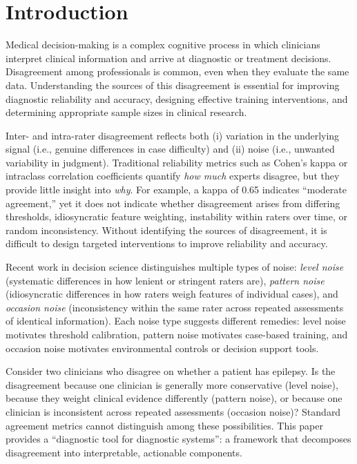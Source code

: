 \section*{Introduction}
\label{707961}

Medical decision-making is a complex cognitive process in which clinicians interpret clinical information and arrive at diagnostic or treatment decisions. Disagreement among professionals is common, even when they evaluate the same data. Understanding the sources of this disagreement is essential for improving diagnostic reliability and accuracy, designing effective training interventions, and determining appropriate sample sizes in clinical research.

Inter- and intra-rater disagreement reflects both (i) variation in the underlying signal (i.e., genuine differences in case difficulty) and (ii) noise (i.e., unwanted variability in judgment). Traditional reliability metrics such as Cohen’s kappa or intraclass correlation coefficients quantify \textit{how much} experts disagree, but they provide little insight into \textit{why}. For example, a kappa of 0.65 indicates “moderate agreement,” yet it does not indicate whether disagreement arises from differing thresholds, idiosyncratic feature weighting, instability within raters over time, or random inconsistency. Without identifying the sources of disagreement, it is difficult to design targeted interventions to improve reliability and accuracy.

Recent work in decision science \cite{Kahneman2021} distinguishes multiple types of noise: \textit{level noise} (systematic differences in how lenient or stringent raters are), \textit{pattern noise} (idiosyncratic differences in how raters weigh features of individual cases), and \textit{occasion noise} (inconsistency within the same rater across repeated assessments of identical information). Each noise type suggests different remedies: level noise motivates threshold calibration, pattern noise motivates case-based training, and occasion noise motivates environmental controls or decision support tools.

Consider two clinicians who disagree on whether a patient has epilepsy. Is the disagreement because one clinician is generally more conservative (level noise), because they weight clinical evidence differently (pattern noise), or because one clinician is inconsistent across repeated assessments (occasion noise)? Standard agreement metrics cannot distinguish among these possibilities. This paper provides a “diagnostic tool for diagnostic systems”: a framework that decomposes disagreement into interpretable, actionable components.

